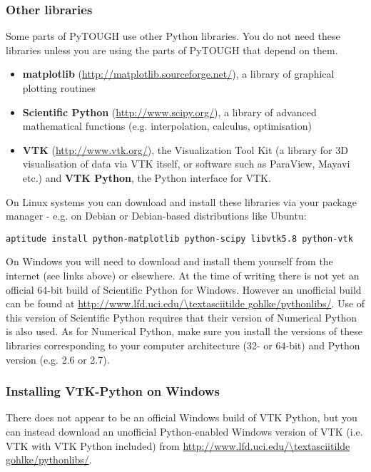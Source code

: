 \subsubsection{Other libraries}


Some parts of PyTOUGH use other Python libraries.  You do not need these libraries unless you are using the parts of PyTOUGH that depend on them.

\begin{itemize}
\item \textbf{matplotlib} (\url{http://matplotlib.sourceforge.net/}), a library of graphical plotting routines
\item \textbf{Scientific Python} (\url{http://www.scipy.org/}), a library of advanced mathematical functions (e.g. interpolation, calculus, optimisation)
\item \textbf{VTK} (\url{http://www.vtk.org/}), the Visualization Tool Kit (a library for 3D visualisation of data via VTK itself, or software such as ParaView, Mayavi etc.) and \textbf{VTK Python}, the Python interface for VTK.
\end{itemize}

On Linux systems you can download and install these libraries via your package manager - e.g. on Debian or Debian-based distributions like Ubuntu:

\texttt{aptitude install python-matplotlib python-scipy libvtk5.8 python-vtk}

On Windows you will need to download and install them yourself from the internet (see links above) or elsewhere.  At the time of writing there is not yet an official 64-bit build of Scientific Python for Windows.  However an unofficial build can be found at \url{http://www.lfd.uci.edu/\textasciitilde gohlke/pythonlibs/}.  Use of this version of Scientific Python requires that their version of Numerical Python is also used.  As for Numerical Python, make sure you install the versions of these libraries corresponding to your computer architecture (32- or 64-bit) and Python version (e.g. 2.6 or 2.7).

\subsubsection{Installing VTK-Python on Windows}

There does not appear to be an official Windows build of VTK Python, but you can instead download an unofficial Python-enabled Windows version of VTK (i.e. VTK with VTK Python included) from \url{http://www.lfd.uci.edu/\textasciitilde gohlke/pythonlibs/}.

